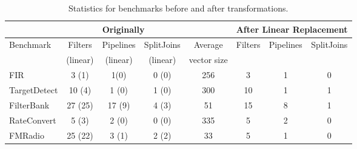\begin{table*}[t]
\vspace{-6pt}
\centering
\small
\begin{tabular}{|l|c|c|c||c||c|c|c|} 
\hline
          & \multicolumn{3}{|c||}{Originally}  &             & \multicolumn{3}{|c|}{After Linear Replacement} \\
\hline
Benchmark & Filters & Pipelines & SplitJoins & Average     & Filters      & Pipelines         & SplitJoins \\
          & (linear)& (linear)  & (linear)   & vector size &              &                   &            \\
\hline
FIR       & 3 (1)  & 1(0)      & 0 (0)      & 256         & 3            & 1                 & 0 \\
\hline
TargetDetect & 10 (4)& 1 (0)    & 1 (0)      & 300         & 10           & 1                 & 1 \\
\hline
FilterBank & 27 (25) & 17 (9)   & 4 (3)      & 51          & 15           & 8                 & 1 \\
\hline
RateConvert& 5 (3)   & 2 (0)    & 0 (0)      & 335         & 5            & 2                 & 0 \\
\hline
FMRadio    & 25 (22) & 3 (1)    & 2 (2)      & 33          & 5            & 1                 & 0 \\
\hline
\end{tabular}
\vspace{-6pt}
\caption{Statistics for benchmarks before and after transformations.
\protect\label{fig:benchmark-statistics}}
\vspace{-10pt}
\end{table*}

